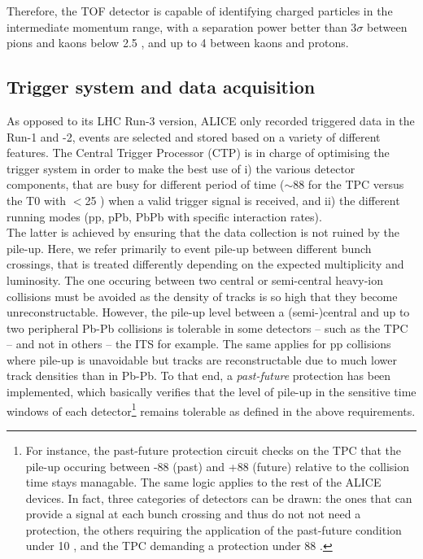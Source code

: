 Therefore, the TOF detector is capable of identifying charged particles in the intermediate momentum range, with a separation power better than 3$\sigma$ between pions and kaons below 2.5 \gmom, and up to 4 \gmom between kaons and protons.

\subsection{Trigger system and data acquisition}

As opposed to its LHC Run-3 version, ALICE only recorded triggered data in the Run-1 and -2, \ie events are selected and stored based on a variety of different features. The Central Trigger Processor (CTP) is in charge of optimising the trigger system in order to make the best use of i) the various detector components, that are busy for different period of time ($\sim$88 \musec for the TPC versus the T0 with $<$25 \nsec) when a valid trigger signal is received, and ii) the different running modes (pp, pPb, PbPb with specific interaction rates).\\

The latter is achieved by ensuring that the data collection is not ruined by the pile-up. Here, we refer primarily to event pile-up between different bunch crossings, that is treated differently depending on the expected multiplicity and luminosity. The one occuring between two central or semi-central heavy-ion collisions must be avoided as the density of tracks is so high that they become unreconstructable. However, the pile-up level between a (semi-)central and up to two peripheral Pb-Pb collisions is tolerable in some detectors -- such as the TPC -- and not in others -- the ITS for example. The same applies for pp collisions where pile-up is unavoidable but tracks are reconstructable due to much lower track densities than in Pb-Pb. To that end, a \textit{past-future} protection has been implemented, which basically verifies that the level of pile-up in the sensitive time windows of each detector\footnote{For instance, the past-future protection circuit checks on the TPC that the pile-up occuring between -88 \musec (past) and +88 \musec (future) relative to the collision time stays managable. The same logic applies to the rest of the ALICE devices. In fact, three categories of detectors can be drawn: the ones that can provide a signal at each bunch crossing and thus do not not need a protection, the others requiring the application of the past-future condition under 10 \musec, and the TPC demanding a protection under 88 \musec.} remains tolerable as defined in the above requirements.\\

